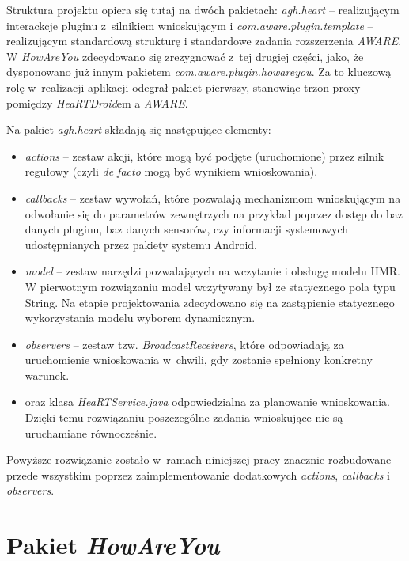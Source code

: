Struktura projektu opiera się tutaj na dwóch pakietach: \textit{agh.heart} -- realizującym interackcje pluginu z~silnikiem wnioskującym i \textit{com.aware.plugin.template} -- realizującym standardową strukturę i standardowe zadania rozszerzenia \textit{AWARE}. W \textit{HowAreYou} zdecydowano się zrezygnować z~tej drugiej części, jako, że dysponowano już innym pakietem \textit{com.aware.plugin.howareyou}. Za to kluczową rolę w~realizacji aplikacji odegrał pakiet pierwszy, stanowiąc trzon proxy pomiędzy \textit{HeaRTDroid}em a \textit{AWARE}.

Na pakiet \textit{agh.heart} składają się następujące elementy:
\begin{itemize}
	\item \textit{actions} -- zestaw akcji, które mogą być podjęte (uruchomione) przez silnik regułowy (czyli \textit{de facto} mogą być wynikiem wnioskowania).
	
	\item \textit{callbacks} -- zestaw wywołań, które pozwalają mechanizmom wnioskującym na odwołanie się do parametrów zewnętrzych na przykład poprzez dostęp do baz danych pluginu, baz danych sensorów, czy informacji systemowych udostępnianych przez pakiety systemu Android.
	
	\item \textit{model} -- zestaw narzędzi pozwalających na wczytanie i obsługę modelu HMR. W pierwotnym rozwiązaniu model wczytywany był ze statycznego pola typu String. Na etapie projektowania zdecydowano się na zastąpienie statycznego wykorzystania modelu wyborem dynamicznym.
	
	\item \textit{observers} -- zestaw tzw. \textit{BroadcastReceivers}, które odpowiadają za uruchomienie wnioskowania w~chwili, gdy zostanie spełniony konkretny warunek.
	
	\item oraz klasa \textit{HeaRTService.java} odpowiedzialna za planowanie wnioskowania. Dzięki temu rozwiązaniu poszczególne zadania wnioskujące nie są uruchamiane równocześnie\cite{heartaware}.
\end{itemize}

Powyższe rozwiązanie zostało w~ramach niniejszej pracy znacznie rozbudowane przede wszystkim poprzez zaimplementowanie dodatkowych \textit{actions}, \textit{callbacks} i \textit{observers}.



\section{Pakiet \textit{HowAreYou}}
\label{sec:pakietHowAreYou}


